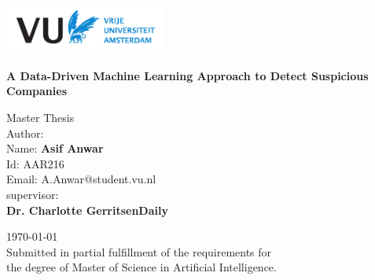 \begin{titlepage}
    \begin{center}
    \vspace{0.8cm}
        \includegraphics[width=0.4\textwidth]{figures/vua.pdf}
        \vspace*{1cm}
        
        \Huge
        \textbf{A Data-Driven Machine Learning Approach to Detect Suspicious Companies}
        
        \vspace{0.5cm}
        \LARGE
        Master Thesis \\
        
        
        \vspace{2.5cm}
        \large
        Author: \\
        \vspace{0.25cm}
        \Large
        Name: \textbf{Asif Anwar}\\
        \vspace{0.25cm}
        \large
        Id: AAR216\\
        \vspace{0.25cm}
        Email: A.Anwar@student.vu.nl\\
        
        \vspace{1.5cm}
        \large
        supervisor: \\
        \vspace{0.25cm}
        \Large
        \textbf{Dr. Charlotte GerritsenDaily}
        

        
        \vfill 
        
        \today \\
        \vspace{0.5cm}
        Submitted in partial fulfillment of the requirements for\\ 
        the degree of Master of Science in Artificial Intelligence. 
        
        \vspace{1cm}
        
   
        
        \vspace{2.5cm}
        
        
    \end{center}
\end{titlepage}